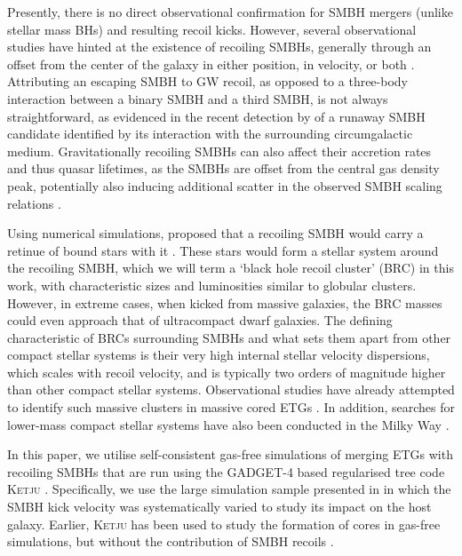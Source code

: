 \documentclass[twocolumn]{aastex631}
\newcommand{\ketju}{\textsc{Ketju}}                           %
\begin{document}
Presently, there is no direct observational confirmation for SMBH mergers (unlike stellar mass BHs) and resulting recoil kicks.
However, several observational studies have hinted at the existence of recoiling SMBHs, generally through an offset from the center of the galaxy in either position, in velocity, or both \citep[e.g.][]{komossa2008,Eracleous2012,comerford2014,pesce2021,hogg2021,Chiaberge2025}. 
Attributing an escaping SMBH to GW recoil, as opposed to a three-body interaction between a binary SMBH and a third SMBH, is not always straightforward, as evidenced in the recent detection by \citet{vandokkum2023} of a runaway SMBH candidate identified by its interaction with the surrounding circumgalactic medium. Gravitationally recoiling SMBHs can also affect their accretion rates and thus quasar lifetimes, as the SMBHs are offset from the central gas density peak, potentially also inducing additional scatter in the observed SMBH scaling relations \citep[e.g.][]{blecha2008,blecha2011}.

Using numerical simulations, \citet{merritt2009} proposed that a recoiling SMBH would carry a retinue of bound stars with it \citep[see also][]{boylan2004,oleary2009}. 
These stars would form a stellar system around the recoiling SMBH, which we will term a `black hole recoil cluster' (BRC) in this work, with characteristic sizes and luminosities similar to globular clusters.
However, in extreme cases, when kicked from massive galaxies, the BRC masses could even approach that of ultracompact dwarf galaxies. 
The defining characteristic of BRCs surrounding SMBHs and what sets them apart from other compact stellar systems is their very high internal stellar velocity dispersions, which scales with recoil velocity, and is typically two orders of magnitude higher than other compact stellar systems. Observational studies have already attempted to identify such massive clusters in massive cored ETGs \citep{Burke-Spolaor2017,Gultekin2021}. In addition, searches for lower-mass compact stellar systems have also been conducted in the Milky Way \citep[e.g.][]{Greene2021,Wu2024}.

In this paper, we utilise self-consistent gas-free simulations of merging ETGs with recoiling SMBHs that are run using the GADGET-4 based regularised tree code \ketju{} \citep{rantala2017,rantala2020,mannerkoski2023}. Specifically, we use the large simulation sample presented in \citet{rawlings2025} in which the SMBH kick velocity was systematically varied to study its impact on the host galaxy. 
Earlier, \ketju{} has been used to study the formation of cores in gas-free simulations, but without the contribution of SMBH recoils \citep{rantala2018,rantala2019,rantala2024,mannerkoski2023,partmann2024}. 
\end{document}
